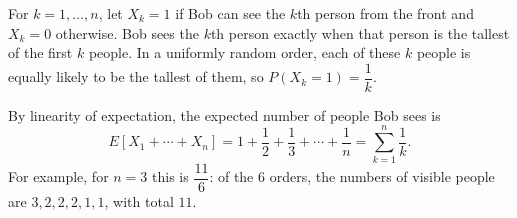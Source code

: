 For $k=1,\ldots,n$, let $X_k=1$ if Bob can see the $k$th person from the front and $X_k=0$ otherwise. Bob sees the $k$th person exactly when that person is the tallest of the first $k$ people. In a uniformly random order, each of these $k$ people is equally likely to be the tallest of them, so $P(X_k=1)=\dfrac{1}{k}$.

By linearity of expectation, the expected number of people Bob sees is
\[E[X_1+\cdots+X_n]=\boxed{1+\dfrac{1}{2}+\dfrac{1}{3}+\cdots+\dfrac{1}{n}}=\sum_{k=1}^n\dfrac{1}{k} .\]
For example, for $n=3$ this is $\dfrac{11}{6}$: of the $6$ orders, the numbers of visible people are $3,2,2,2,1,1$, with total $11$.
